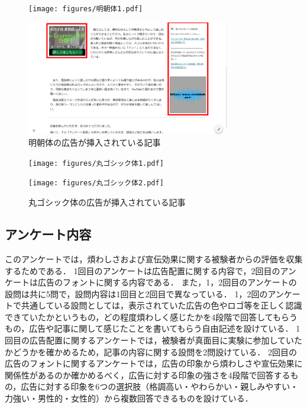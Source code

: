 \documentclass[12pt,a4j,titlepage]{ltjsarticle}
\begin{document}
\begin{figure}[H]
  \begin{minipage}[b]{0.50\linewidth}
    \centering
    \texttt{[image: figures/明朝体1.pdf]}
  \end{minipage}
  \begin{minipage}[b]{0.50\linewidth}
    \centering
    \includegraphics[height=50mm]{figures/明朝体2.pdf}
  \end{minipage}
   \caption{明朝体の広告が挿入されている記事}
    \label{fig:明朝体}
\end{figure}

\begin{figure}[H]
  \begin{minipage}[b]{0.50\linewidth}
    \centering
    \texttt{[image: figures/丸ゴシック体1.pdf]}
  \end{minipage}
  \begin{minipage}[b]{0.50\linewidth}
    \centering
    \texttt{[image: figures/丸ゴシック体2.pdf]}
  \end{minipage}
   \caption{丸ゴシック体の広告が挿入されている記事}
    \label{fig:丸ゴシック体}
\end{figure}

\subsection{アンケート内容}
このアンケートでは，煩わしさおよび宣伝効果に関する被験者からの評価を収集するためである．
1回目のアンケートは広告配置に関する内容で，2回目のアンケートは広告のフォントに関する内容である．
また，1，2回目のアンケートの設問は共に5問で，設問内容は1回目と2回目で異なっている．
1，2回のアンケートで共通している設問としては，表示されていた広告の色やロゴ等を正しく認識できていたかというもの，どの程度煩わしく感じたかを4段階で回答してもらうもの，広告や記事に関して感じたことを書いてもらう自由記述を設けている．
1回目の広告配置に関するアンケートでは，被験者が真面目に実験に参加していたかどうかを確かめるため，記事の内容に関する設問を2問設けている．
2回目の広告のフォントに関するアンケートでは，広告の印象から煩わしさや宣伝効果に関係性があるのか確かめるべく，広告に対する印象の強さを4段階で回答するもの，広告に対する印象を6つの選択肢（格調高い・やわらかい・親しみやすい・力強い・男性的・女性的）から複数回答できるものを設けている．
\end{document}
